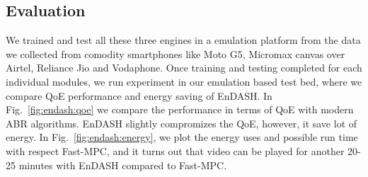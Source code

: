 \subsection{Evaluation}
We trained and test all these three engines in a emulation platform from the data we collected from comodity smartphones like Moto G5, Micromax canvas over Airtel, Reliance Jio and Vodaphone. Once training and testing completed for each individual modules, we run experiment in our emulation based test bed, where we compare QoE performance and energy saving of EnDASH. In Fig.~\ref{fig:endash:qoe} we compare the performance in terms of QoE with modern ABR algorithms. EnDASH slightly compromizes the QoE, however, it save lot of energy. In Fig.~\ref{fig:endash:energy}, we plot the energy uses and possible run time with respect Fast-MPC, and it turns out that video can be played for another 20-25 minutes with EnDASH compared to Fast-MPC.
